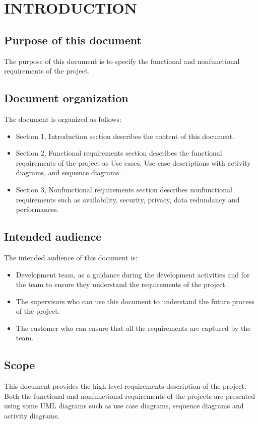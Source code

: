 \section{INTRODUCTION}
\subsection{Purpose of this document}
The purpose of this document is to specify the functional and nonfunctional requirements of the project. 
\subsection{Document organization}
The document is organized as follows:
\begin{itemize}
	\item Section 1, Introduction section describes the content of this document.
	\item Section 2, Functional requirements section describes the functional requirements of the project as Use cases, Use case descriptions with activity diagrams, and sequence diagrams.
	\item Section 3, Nonfunctional requirements section describes nonfunctional requirements such as availability, security, privacy, data redundancy and performances.
\end{itemize}
\subsection{Intended audience}
The intended audience of this document is: 
\begin{itemize}
	\item Development team, as a guidance during the development activities and for the team to ensure they understand the requirements of the project.
	\item The supervisors who can use this document to understand the future process of the project.
	\item The customer who can ensure that all the requirements are captured by the team.
\end{itemize}
\subsection{Scope}
This document provides the high level requirements description of the project. Both the functional and nonfunctional requirements of the projects are presented using some UML diagrams such as use case diagrams, sequence diagrams and activity diagrams.
